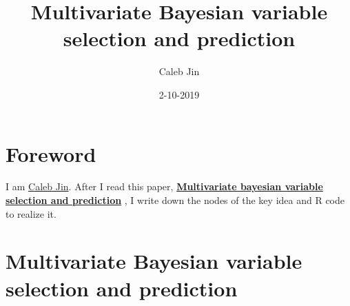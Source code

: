 \documentclass[]{book}
\title{Multivariate Bayesian variable selection and prediction}
\author{Caleb Jin}
\date{2-10-2019}
\begin{document}
\maketitle

{
\setcounter{tocdepth}{1}
\tableofcontents
}
\hypertarget{foreword}{%
\chapter{Foreword}\label{foreword}}

I am \href{https://www.sjin.name/}{Caleb Jin}. After I read this paper, \textbf{\href{https://rss.onlinelibrary.wiley.com/doi/abs/10.1111/1467-9868.00144}{Multivariate bayesian variable selection and prediction}} \citep{Brown}, I write down the nodes of the key idea and R code to realize it.

\newcommand\T{{\top}}
\newcommand\ubeta{{\boldsymbol \beta}}
\newcommand\uSigma{{\boldsymbol \Sigma}}
\newcommand\uepsilon{{\boldsymbol \epsilon}}
\newcommand\umu{{\boldsymbol \mu}}
\newcommand\utheta{{\boldsymbol \theta}}
\newcommand\ubg{{\boldsymbol \gamma}}
\newcommand\uphi{{\boldsymbol \phi}}
\newcommand\uxi{{\boldsymbol \xi}}

\newcommand\0{{\bf 0}}
\newcommand\uA{{\bf A}}
\newcommand\ua{{\bf a}}
\newcommand\uB{{\bf B}}
\newcommand\ub{{\bf b}}
\newcommand\uC{{\bf C}}
\newcommand\uD{{\bf D}}
\newcommand\uE{{\bf E}}
\newcommand\ue{{\bf e}}
\newcommand\uH{{\bf H}}
\newcommand\uI{{\bf I}}
\newcommand\uK{{\bf K}}
\newcommand\uM{{\bf M}}
\newcommand\uQ{{\bf Q}}
\newcommand\uV{{\bf V}}
\newcommand\uX{{\bf X}}
\newcommand\ux{{\bf x}}
\newcommand\uY{{\bf Y}}
\newcommand\uy{{\bf y}}
\newcommand\uz{{\bf z}}
\newcommand\diag{{\rm diag}}
\newcommand{\tr}{{\text tr}}

\hypertarget{multivariate-bayesian-variable-selection-and-prediction}{%
\chapter{Multivariate Bayesian variable selection and prediction}\label{multivariate-bayesian-variable-selection-and-prediction}}
\end{document}

